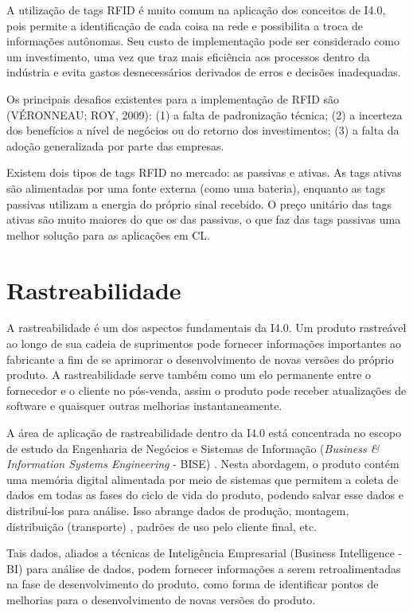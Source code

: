 \documentclass[
	12pt,				%
	oneside,			%
	a4paper,			%
	english,			%
	brazil				%
]{abntex2}
\begin{document}
	A utilização de tags RFID é muito comum na aplicação dos conceitos de I4.0, pois permite a identificação de cada coisa na rede e possibilita a troca de informações autônomas. Seu custo de implementação pode ser considerado como um investimento, uma vez que traz mais eficiência aos processos dentro da indústria e evita gastos desnecessários derivados de erros e decisões inadequadas. 
	
	Os principais desafios existentes para a implementação de RFID são (VÉRONNEAU; ROY, 2009): (1) a falta de padronização técnica; (2) a incerteza dos benefícios a nível de negócios ou do retorno dos investimentos; (3) a falta da adoção generalizada por parte das empresas.
	
	Existem dois tipos de tags RFID no mercado: as passivas e ativas. As tags ativas são alimentadas por uma fonte externa (como uma bateria), enquanto as tags passivas utilizam a energia do próprio sinal recebido. O preço unitário das tags ativas são muito maiores do que os das passivas, o que faz das tags passivas uma melhor solução para as aplicações em CL.

	\section{Rastreabilidade}

	A rastreabilidade é um dos aspectos fundamentais da I4.0. Um produto rastreável ao longo de sua cadeia de suprimentos pode fornecer informações importantes ao fabricante a fim de se aprimorar o desenvolvimento de novas versões do próprio produto. A rastreabilidade serve também como um elo permanente entre o fornecedor e o cliente no pós-venda, assim o produto pode receber atualizações de software e quaisquer outras melhorias instantaneamente.

	A área de aplicação de rastreabilidade dentro da I4.0 está concentrada no escopo de estudo da Engenharia de Negócios e Sistemas de Informação (\textit{Business \& Information Systems Engineering} - BISE) . Nesta abordagem, o produto contém uma memória digital \cite{lasi2014industryfour} alimentada por meio de sistemas que permitem a coleta de dados em todas as fases do ciclo de vida do produto, podendo salvar esse dados e distribuí-los para análise. Isso abrange dados de produção, montagem, distribuição (transporte) \cite{brandherm2011productmemory}, padrões de uso pelo cliente final, etc.

	Tais dados, aliados a técnicas de Inteligência Empresarial (Business Intelligence - BI) para análise de dados, podem fornecer informações a serem retroalimentadas na fase de desenvolvimento do produto, como forma de identificar pontos de melhorias para o desenvolvimento de novas versões do produto.
\end{document}
